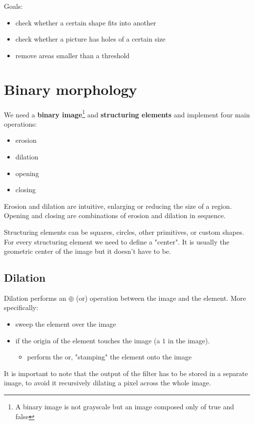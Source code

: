 \documentclass{article}
\begin{document}
Goals:
\begin{itemize}
    \item check whether a certain shape fits into another
    \item check whether a picture has holes of a certain size
    \item remove areas smaller than a threshold
\end{itemize}

\section*{Binary morphology}
We need a \textbf{binary image}\footnote{A binary image is not grayscale but an image composed only of true and false} and \textbf{structuring elements} and implement four main operations:
\begin{itemize}
    \item erosion
    \item dilation
    \item opening
    \item closing
\end{itemize}
Erosion and dilation are intuitive, enlarging or reducing the size of a region. Opening and closing are combinations of erosion and dilation in sequence.

Structuring elements can be squares, circles, other primitives, or custom shapes. For every structuring element we need to define a "center". It is usually the geometric center of the image but it doesn't have to be.

\subsection{Dilation}
Dilation performs an $\oplus$ (or) operation between the image and the element. More specifically:
\begin{itemize}
    \item sweep the element over the image
    \item if the origin of the element touches the image (a $1$ in the image).
        \begin{itemize}
            \item perform the or, "stamping" the element onto the image
        \end{itemize}
\end{itemize}
It is important to note that the output of the filter has to be stored in a separate image, to avoid it recursively dilating a pixel across the whole image.
\end{document}
